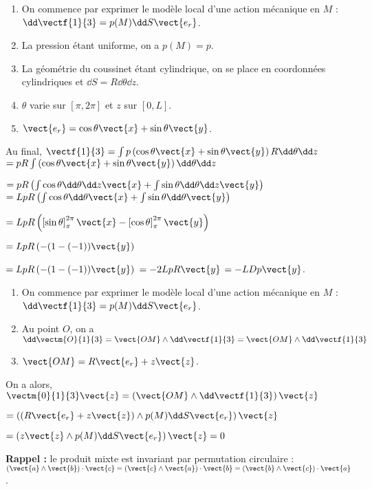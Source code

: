 \ifprof
\begin{corrige}
\begin{enumerate}
\item On commence par exprimer le modèle local d'une action mécanique en $M$ : $\dd \vectf{1}{3} = p(M) \dd S \vect{e_r}$.
\item La pression étant uniforme, on a $p(M)=p$.
\item La géométrie du coussinet étant cylindrique, on se place en coordonnées cylindriques et $\dd S = R\dd \theta \dd z$.  
\item $\theta$ varie sur $[\pi, 2\pi]$ et $z$ sur $[0,L]$. 
\item $\vect{e_r}=\cos\theta\vect{x}+\sin\theta\vect{y}$.
\end{enumerate}
Au final, $\vectf{1}{3}=\int p  \left( \cos\theta\vect{x}+\sin\theta\vect{y}\right)R\dd \theta \dd z$
$=pR\int \left( \cos\theta\vect{x}+\sin\theta\vect{y}\right)\dd \theta \dd z$

$=pR\left( \int  \cos\theta\dd \theta \dd z \vect{x}+\int \sin\theta\dd \theta \dd z   \vect{y}\right)$
$=LpR\left( \int  \cos\theta\dd \theta  \vect{x}+\int \sin\theta\dd \theta   \vect{y}\right)$

$=LpR\left( \left[ \sin \theta \right]^{2\pi}_{\pi}  \vect{x}-\left[\cos \theta \right]^{2\pi}_{\pi}   \vect{y}\right)$

$=LpR\left( -(1-(-1))   \vect{y}\right)$

$=LpR\left( -(1-(-1))   \vect{y}\right)$ $=-2LpR   \vect{y}$ $=-LDp   \vect{y}$.

\end{corrige}
\else
\fi


\ifprof
\begin{corrige}
\begin{enumerate}
\item On commence par exprimer le modèle local d'une action mécanique en $M$ : $\dd \vectf{1}{3} = p(M) \dd S \vect{e_r}$.
\item Au point $O$, on a $\dd \vectm{O}{1}{3}=\vect{OM}\wedge \dd \vectf{1}{3} =\vect{OM}\wedge \dd \vectf{1}{3} $
\item $\vect{OM}=R\vect{e_r}+z\vect{z}$.
\end{enumerate}
On a alors, $ \vectm{0}{1}{3}\vect{z} =\left( \vect{OM}\wedge \dd \vectf{1}{3}\right) \vect{z}$

$ = \left( \left( R\vect{e_r}+z\vect{z} \right) \wedge  p(M) \dd S \vect{e_r}\right) \vect{z}$

$ = \left(z\vect{z} \wedge  p(M) \dd S \vect{e_r}\right) \vect{z} = 0$


\textbf{Rappel :} le produit mixte est invariant par permutation circulaire : $\left( \vect{a}\wedge \vect{b}\right)\cdot \vect{c} = \left( \vect{c}\wedge \vect{a}\right)\cdot \vect{b} = \left( \vect{b}\wedge \vect{c}\right)\cdot \vect{a}$.
\end{corrige}
\else
\fi

